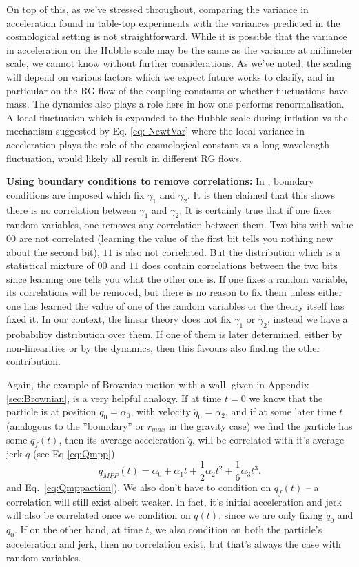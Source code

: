 \documentclass[aps,pra,amsmath,amssymb,amsthm,floatfix,nofootinbib,notitlepage,superscriptaddress,10pt]{revtex4-2}
\begin{document}
On top of this, as we've stressed throughout, comparing the variance in acceleration found in table-top experiments with the variances predicted in the cosmological setting is not straightforward. While it is possible that the variance in acceleration on the Hubble scale may be the same as the variance at millimeter scale, we cannot know without further considerations. As we've noted, the scaling will depend on various factors which we expect future works to clarify, and in particular on the RG flow of the coupling constants or whether fluctuations have mass. The dynamics also plays a role here in how one performs renormalisation. A local fluctuation which is expanded to the Hubble scale during inflation vs the mechanism suggested by Eq. \eqref{eq: NewtVar} where the local variance in acceleration plays the role of the cosmological constant vs a long wavelength fluctuation, would likely all result in different RG flows. 




{\bf\noindent Using boundary conditions to remove correlations:} 
In \cite{hertzberg2024comment}, boundary conditions are imposed which fix $\gamma_1$ and $\gamma_2$. It is then claimed that this shows there is no correlation between $\gamma_1$ and $\gamma_2$. It is certainly true that if one fixes random variables, one removes any correlation between them. Two bits with value $00$ are not correlated (learning the value of the first bit tells you nothing new about the second bit), $11$ is also not correlated. But the distribution which is a statistical mixture of $00$ and $11$ does contain correlations between the two bits since learning one tells you what the other one is. If one fixes a random variable, its correlations will be removed, but there is no reason to fix them unless either one has learned the value of one of the random variables or the theory itself has fixed it. In our context, the linear theory does not fix $\gamma_1$ or $\gamma_2$, instead we have a probability distribution over them. If one of them is later determined, either by non-linearities or by the dynamics, then this favours also finding the other contribution.

Again, the example of Brownian motion with a wall, given in Appendix \ref{sec:Brownian}, is a very helpful analogy. If at time $t=0$ we know that the particle is at position $q_0=\alpha_0$, with velocity $\dot{q}_0=\alpha_2$, and if at some later time $t$ (analogous to the ''boundary'' or $r_{max}$ in the gravity case) we find the particle has some $q_f(t)$, then its average acceleration $\ddot{q}$, will be correlated with it's average jerk $\dddot{q}$ (see Eq \eqref{eq:Qmpp})
\begin{equation*}
	q_{MPP}(t)=\alpha_0 + \alpha_1 t+\frac{1}{2}\alpha_2 t^2 + \frac{1}{6}\alpha_3 t^3.
\end{equation*}
and Eq.~\eqref{eq:Qmppaction}). We also don't have to condition on $q_f(t)$ -- a correlation will still exist albeit weaker. In fact, it's initial acceleration and jerk will also be correlated once we condition on $q(t)$, since we are only fixing $\dot{q}_0$ and $\ddot{q}_0$. If on the other hand, at time $t$, we also condition on both the particle's acceleration and jerk, then no correlation exist, but that's always the case with random variables. 
\end{document}
